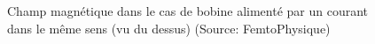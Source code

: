 \documentclass[12pt]{article}
\begin{document}
\begin{figure}[h!]
    \centering
    \quad \quad
    \caption{Champ magnétique dans le cas de bobine alimenté par un courant dans le même sens (vu du dessus) (Source: FemtoPhysique)}
\end{figure}
\end{document}
